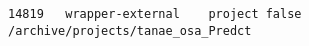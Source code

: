 \begin{lstlisting}
14819	wrapper-external	project	false	/archive/projects/tanae_osa_Predct


\end{lstlisting}